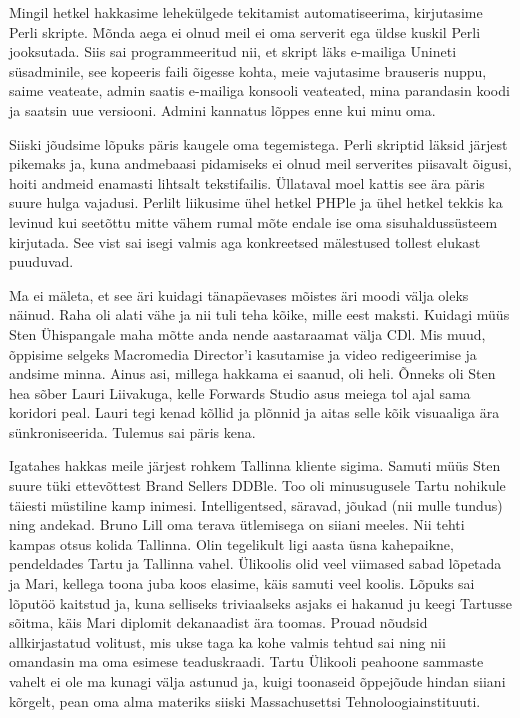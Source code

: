 Mingil hetkel hakkasime lehekülgede tekitamist automatiseerima, kirjutasime Perli skripte. Mõnda aega ei olnud meil ei oma serverit ega üldse kuskil Perli jooksutada. Siis sai programmeeritud nii, et skript läks e-mailiga Unineti süsadminile, see kopeeris faili õigesse kohta, meie vajutasime brauseris nuppu, saime veateate, admin saatis e-mailiga konsooli veateated, mina parandasin koodi ja saatsin uue versiooni. Admini kannatus lõppes enne kui minu oma. 

Siiski jõudsime lõpuks päris kaugele oma tegemistega. Perli skriptid läksid järjest pikemaks ja, kuna andmebaasi pidamiseks ei olnud meil serverites piisavalt õigusi, hoiti andmeid enamasti lihtsalt tekstifailis. Üllataval moel kattis see ära päris suure hulga vajadusi. Perlilt liikusime ühel hetkel PHPle ja ühel hetkel tekkis ka levinud kui seetõttu mitte vähem rumal mõte endale ise oma sisuhaldussüsteem kirjutada. See vist sai isegi valmis aga konkreetsed mälestused tollest elukast puuduvad. 

Ma ei mäleta, et see äri kuidagi tänapäevases mõistes äri moodi välja oleks näinud. Raha oli alati vähe ja nii tuli teha kõike, mille eest maksti. Kuidagi müüs Sten Ühispangale maha mõtte anda nende aastaraamat välja CDl. Mis muud, õppisime selgeks Macromedia Director'i kasutamise ja video redigeerimise ja andsime minna. Ainus asi, millega hakkama ei saanud, oli heli. Õnneks oli Sten hea sõber Lauri Liivakuga, kelle Forwards Studio asus meiega tol ajal sama koridori peal. Lauri tegi kenad kõllid ja plõnnid ja aitas selle kõik visuaaliga ära sünkroniseerida. Tulemus sai päris kena. 

Igatahes hakkas meile järjest rohkem Tallinna kliente sigima. Samuti müüs Sten suure tüki ettevõttest Brand Sellers DDBle. Too oli minusugusele Tartu nohikule täiesti müstiline kamp inimesi. Intelligentsed, säravad, jõukad (nii mulle tundus) ning andekad. Bruno Lill oma terava ütlemisega on siiani meeles.  Nii tehti kampas otsus kolida Tallinna. Olin tegelikult ligi aasta üsna kahepaikne, pendeldades Tartu ja Tallinna vahel. Ülikoolis olid veel viimased sabad lõpetada ja Mari, kellega toona juba koos elasime, käis samuti veel koolis. Lõpuks sai lõputöö kaitstud ja, kuna selliseks triviaalseks asjaks ei hakanud ju keegi Tartusse sõitma, käis Mari diplomit dekanaadist ära toomas. Prouad nõudsid allkirjastatud volitust, mis ukse taga ka kohe valmis tehtud sai ning nii omandasin ma oma esimese teaduskraadi. Tartu Ülikooli peahoone sammaste vahelt ei ole ma kunagi välja astunud ja, kuigi toonaseid õppejõude hindan siiani kõrgelt, pean oma alma materiks siiski Massachusettsi Tehnoloogiainstituuti. 

